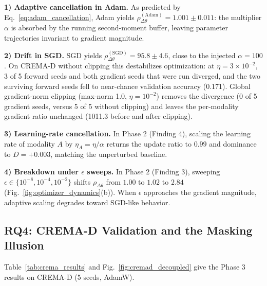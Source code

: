 \documentclass[conference]{IEEEtran}
\begin{document}
\textbf{1) Adaptive cancellation in Adam.} As predicted by Eq.~\eqref{eq:adam_cancellation}, Adam yields $\rho_{\Delta\theta}^{(\text{Adam})} = 1.001 \pm 0.011$: the multiplier $\alpha$ is absorbed by the running second-moment buffer, leaving parameter trajectories invariant to gradient magnitude.

\textbf{2) Drift in SGD.} SGD yields $\rho_{\Delta\theta}^{(\text{SGD})} = 95.8 \pm 4.6$, close to the injected $\alpha = 100$. On CREMA-D without clipping this destabilizes optimization: at $\eta = 3\times10^{-2}$, 3 of 5 forward seeds and both gradient seeds that were run diverged, and the two surviving forward seeds fell to near-chance validation accuracy (0.171). Global gradient-norm clipping (max-norm 1.0, $\eta = 10^{-2}$) removes the divergence (0 of 5 gradient seeds, versus 5 of 5 without clipping) and leaves the per-modality gradient ratio unchanged (1011.3 before and after clipping).

\textbf{3) Learning-rate cancellation.} In Phase 2 (Finding 4), scaling the learning rate of modality $A$ by $\eta_A = \eta/\alpha$ returns the update ratio to $0.99$ and dominance to $D = +0.003$, matching the unperturbed baseline.

\textbf{4) Breakdown under $\epsilon$ sweeps.} In Phase 2 (Finding 3), sweeping $\epsilon \in \{10^{-8}, 10^{-4}, 10^{-2}\}$ shifts $\rho_{\Delta\theta}$ from $1.00$ to $1.02$ to $2.84$ (Fig.~\ref{fig:optimizer_dynamics}(b)). When $\epsilon$ approaches the gradient magnitude, adaptive scaling degrades toward SGD-like behavior.

\subsection{RQ4: CREMA-D Validation and the Masking Illusion}
Table~\ref{tab:crema_results} and Fig.~\ref{fig:cremad_decoupled} give the Phase 3 results on CREMA-D (5 seeds, AdamW).

\begin{table}[!t]
\centering
\caption{CREMA-D: Naive Zero-Masking vs.\ Decoupled Metrics (AdamW, 5 seeds)}
\label{tab:crema_results}
\renewcommand{\arraystretch}{1.1}
\end{table}
\end{document}
